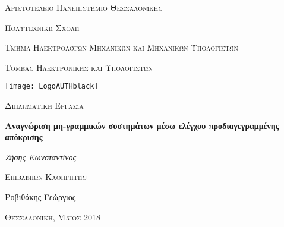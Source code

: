 \documentclass[12pt]{report}
\begin{document}

\begin{titlepage}
	\centering
	{\scshape\Large Αριστοτέλειο Πανεπιστήμιο Θεσσαλονίκης \par}
	{\scshape\Large Πολυτεχνική Σχολή \par}
	{\scshape\Large Τμήμα Ηλεκτρολόγων Μηχανικών και Μηχανικών Υπολογιστών \par}
	{\scshape\Large Τομέας Ηλεκτρονικής και Υπολογιστών \par}
	\vspace{0.5cm}
	\texttt{[image: LogoAUTHblack]} \par
	\vspace{1cm}
	{\scshape\Large Διπλωματική Εργασία \par}
	\vspace{0.3cm}
	{\huge\bfseries Αναγνώριση μη-γραμμικών συστημάτων μέσω ελέγχου προδιαγεγραμμένης απόκρισης \par}
	\vspace{2cm}
	{\Large\itshape Ζήσης Κωνσταντίνος \par}
	\vfill
	{\scshape\large Επιβλέπων Καθηγητής \par}
	{\large Ροβιθάκης Γεώργιος}
	\vfill
	{\scshape\large Θεσσαλονίκη, Μάιος 2018\par}
\end{titlepage}

\digital
\else
\fi

\pagestyle{fancy}
\fancyhf{}
\fancyhead[L]{\textit{ \nouppercase{\leftmark}} }
\fancyhead[R]{\textit{ \nouppercase{\rightmark}} }
\digital
	\fancyfoot[C]{\thepage}
\else
	\fancyfoot[LE,RO]{\thepage}
\fi
\end{document}
